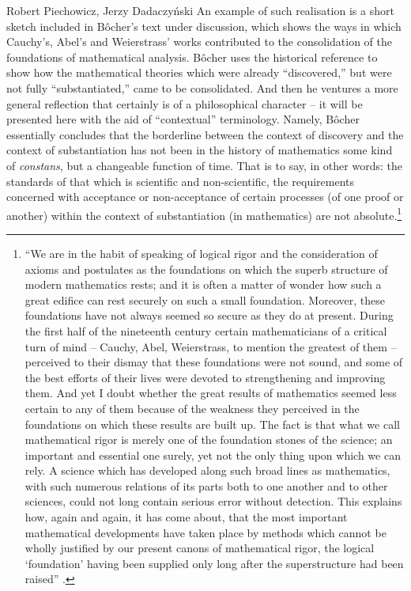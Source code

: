\begin{artengenv}{Robert Piechowicz, Jerzy Dadaczyński}
An example of such realisation is a short sketch included in Bôcher's text under discussion, which shows the ways in which Cauchy's, Abel's and Weierstrass' works contributed to the consolidation of the foundations of mathematical analysis. Bôcher uses the historical reference to show how the mathematical theories which were already ``discovered,'' but were not fully ``substantiated,'' came to be consolidated. And then he ventures a more general reflection that certainly is of a philosophical character -- it will be presented here with the aid of ``contextual'' terminology. Namely, Bôcher essentially concludes that the borderline between the context of discovery and the context of substantiation has not been in the history of mathematics some kind of \textit{constans}, but a changeable function of time. That is to say, in other words: the standards of that which is scientific and non-scientific, the requirements concerned with acceptance or non-acceptance of certain processes (of one proof or another) within the context of substantiation (in mathematics) are not absolute.\footnote{``We are in the habit of speaking of logical rigor and the consideration of axioms and postulates as the foundations on which the superb structure of modern mathematics rests; and it is often a matter of wonder how such a great edifice can rest securely on such a small foundation. Moreover, these foundations have not always seemed so secure as they do at present. During the first half of the nineteenth century certain mathematicians of a critical turn of mind -- Cauchy, Abel, Weierstrass, to mention the greatest of them -- perceived to their dismay that these foundations were not sound, and some of the best efforts of their lives were devoted to strengthening and improving them. And yet I doubt whether the great results of mathematics seemed less certain to any of them because of the weakness they perceived in the foundations on which these results are built up. The fact is that what we call mathematical rigor is merely one of the foundation stones of the science; an important and essential one surely, yet not the only thing upon which we can rely. A science which has developed along such broad lines as mathematics, with such numerous relations of its parts both to one another and to other sciences, could not long contain serious error without detection. This explains how, again and again, it has come about, that the most important mathematical developments have taken place by methods which cannot be wholly justified by our present canons of mathematical rigor, the logical ‘foundation' having been supplied only long after the superstructure had been raised''
\parencite[][pp.133–134]{bocher_fundamental_1904}.%
}


\end{artengenv}
